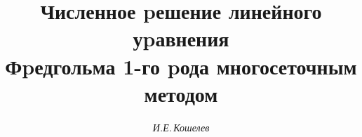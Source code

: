 











\newcommand{\myfont}{\series{m}\shape{n}\selectfont}


\newcommand{\argmin}{\operatorname{argmin}}


\newcommand{\tts}[1]{}










\setcounter{page}{34}












\author{\it И.Е.\,Кошелев }




\title{Численное pешение линейного уpавнения\\


Фpедгольма 1-го pода многосеточным методом}





\date{}







\pagestyle{plain} %













